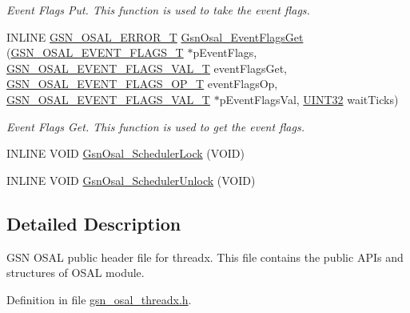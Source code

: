 \begin{DoxyCompactItemize}
\begin{DoxyCompactList}\small\item\em Event Flags Put. This function is used to take the event flags. \end{DoxyCompactList}\item 
INLINE \hyperlink{a00659_ga36216a7aacd1d5024bc7b8bf39c3f46b}{GSN\_\-OSAL\_\-ERROR\_\-T} \hyperlink{a00628_gaf776c600539bb9e5945b60e17cef7a4f}{GsnOsal\_\-EventFlagsGet} (\hyperlink{a00628_gab93fdfc637101a29260ca105d3eb924e}{GSN\_\-OSAL\_\-EVENT\_\-FLAGS\_\-T} $\ast$pEventFlags, \hyperlink{a00536_afb39f905ce07232becc42deeccb9ad4c}{GSN\_\-OSAL\_\-EVENT\_\-FLAGS\_\-VAL\_\-T} eventFlagsGet, \hyperlink{a00536_a3782687de549490574b44f3374fb5731}{GSN\_\-OSAL\_\-EVENT\_\-FLAGS\_\-OP\_\-T} eventFlagsOp, \hyperlink{a00536_afb39f905ce07232becc42deeccb9ad4c}{GSN\_\-OSAL\_\-EVENT\_\-FLAGS\_\-VAL\_\-T} $\ast$pEventFlagsVal, \hyperlink{a00660_gae1e6edbbc26d6fbc71a90190d0266018}{UINT32} waitTicks)
\begin{DoxyCompactList}\small\item\em Event Flags Get. This function is used to get the event flags. \end{DoxyCompactList}\item 
INLINE VOID \hyperlink{a00536_a70ef03b4e0684d322882a09455aa847b}{GsnOsal\_\-SchedulerLock} (VOID)
\item 
INLINE VOID \hyperlink{a00536_a88a2be939cc7b964fa1729079e0eb121}{GsnOsal\_\-SchedulerUnlock} (VOID)
\end{DoxyCompactItemize}


\subsection{Detailed Description}
GSN OSAL public header file for threadx. This file contains the public APIs and structures of OSAL module. 

Definition in file \hyperlink{a00536_source}{gsn\_\-osal\_\-threadx.h}.



